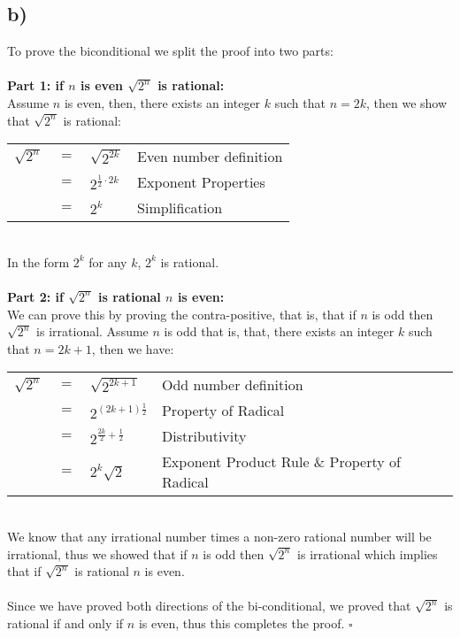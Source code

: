 \documentclass{article}
\begin{document}
\subsection*{b)}
To prove the biconditional we split the proof into two parts:\\\\
\textbf{Part 1: if $n$ is even $\sqrt{2^n}$ is rational:}\\
Assume $n$ is even, then, there exists an integer $k$ such that $n=2k$, then we show that $\sqrt{2^n}$ is rational:
\begin{table}[htp]
    \centering
    \begin{tabular}{ccll}
    $\sqrt{2^n}$&$=$& $\sqrt{2^{2k}}$& Even number definition\\
    &$=$&$2^{\frac{1}{2}\cdot 2k}$ & Exponent Properties\\
    &$=$&$2^k$ & Simplification
        \end{tabular}
\end{table} \\
In the form $2^k$ for any $k$, $2^k$ is rational.\\\\
\textbf{Part 2: if $\sqrt{2^n}$ is rational $n$ is even:}\\
We can prove this by proving the contra-positive, that is, that if $n$ is odd then $\sqrt{2^n}$ is irrational. Assume $n$ is odd that is, that, there exists an integer $k$ such that $n=2k+1$, then we have:
\begin{table}[htp]
    \centering
    \begin{tabular}{ccll}
        $\sqrt{2^n}$&$=$& $\sqrt{2^{2k+1}}$&Odd number definition\\
        &$=$& $2^{(2k+1)\frac{1}{2}}$&Property of Radical\\
        &$=$& $2^{\frac{2k}{2}+\frac{1}{2}}$&Distributivity\\
        &$=$& $2^k\sqrt{2}$&Exponent Product Rule \& Property of Radical\\    
    \end{tabular}
\end{table} \\
We know that any irrational number times a non-zero rational number will be irrational, thus we showed that if $n$ is odd then $\sqrt{2^n}$ is irrational which implies that if $\sqrt{2^n}$ is rational $n$ is even. \\\\ Since we have proved both directions of the bi-conditional, we proved that $\sqrt{2^n}$ is rational if and only if $n$ is even, thus this completes the proof. $\square$
\end{document}
